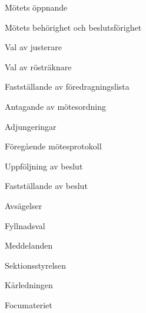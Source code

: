 \documentclass[prelim]{sektionsmote}
\begin{document}
\maketitle

\begin{ootd}

\item{Mötets öppnande}

\item{Mötets behörighet och beslutsförighet}

\item{Val av justerare}

\item{Val av rösträknare}

\item{Fastställande av föredragningslista}

\item{Antagande av mötesordning}

\item{Adjungeringar}

\item{Föregående mötesprotokoll}

\item{Uppföljning av beslut}

\item{Fastställande av beslut}
\begin{ootd}
    \item Avsägelser
    \item Fyllnadsval
\end{ootd}

\item{Meddelanden}
\begin{ootd}
    \item Sektionsstyrelsen
    \item Kårledningen
    \item Focumateriet
\end{ootd}


\end{ootd}
\end{document}
